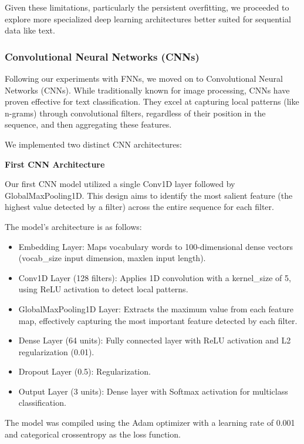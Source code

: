 Given these limitations, particularly the persistent overfitting, we proceeded to explore more specialized deep learning architectures better suited for sequential data like text.

\subsubsection{\textbf{Convolutional Neural Networks (CNNs)}}

Following our experiments with FNNs, we moved on to Convolutional Neural Networks (CNNs). While traditionally known for image processing, CNNs have proven effective for text classification. They excel at capturing local patterns (like n-grams) through convolutional filters, regardless of their position in the sequence, and then aggregating these features.

We implemented two distinct CNN architectures:

\textbf{First CNN Architecture}

Our first CNN model utilized a single Conv1D layer followed by GlobalMaxPooling1D. This design aims to identify the most salient feature (the highest value detected by a filter) across the entire sequence for each filter.

The model's architecture is as follows:

\begin{itemize}
    \item Embedding Layer: Maps vocabulary words to 100-dimensional dense vectors (vocab\_size input dimension, maxlen input length).
    \item Conv1D Layer (128 filters): Applies 1D convolution with a kernel\_size of 5, using ReLU activation to detect local patterns.
    \item GlobalMaxPooling1D Layer: Extracts the maximum value from each feature map, effectively capturing the most important feature detected by each filter.
    \item Dense Layer (64 units): Fully connected layer with ReLU activation and L2 regularization (0.01).
    \item Dropout Layer (0.5): Regularization.
    \item Output Layer (3 units): Dense layer with Softmax activation for multiclass classification.
\end{itemize}

The model was compiled using the Adam optimizer with a learning rate of 0.001 and categorical crossentropy as the loss function.

